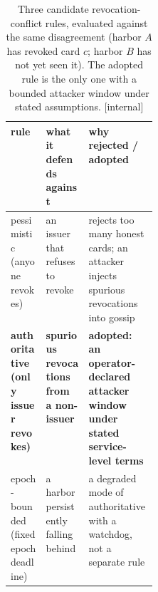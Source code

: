 %
\begin{table}[H]
\centering
\caption{Three candidate revocation-conflict rules, evaluated against the
same disagreement (harbor $A$ has revoked card $c$; harbor $B$ has not yet
seen it). The adopted rule is the only one with a bounded attacker window
under stated assumptions. [internal]}
\label{tab:fh-revocation-rules}
\small
\renewcommand{\arraystretch}{1.2}
\begin{tabularx}{\linewidth}{@{}>{\raggedright\arraybackslash}p{0.24\linewidth} >{\raggedright\arraybackslash}X >{\raggedright\arraybackslash}X@{}}
\toprule
\textbf{rule} & \textbf{what it defends against} & \textbf{why rejected / adopted} \\
\midrule
pessimistic (anyone revokes) & an issuer that refuses to revoke & rejects too many honest cards; an attacker injects spurious revocations into gossip \\
\textbf{authoritative (only issuer revokes)} & \textbf{spurious revocations from a non-issuer} & \textbf{adopted: an \mbox{operator-declared} attacker window under stated \mbox{service-level} terms} \\
epoch-bounded (fixed epoch deadline) & a harbor persistently falling behind & a degraded mode of authoritative with a watchdog, not a separate rule \\
\bottomrule
\end{tabularx}
\end{table}
